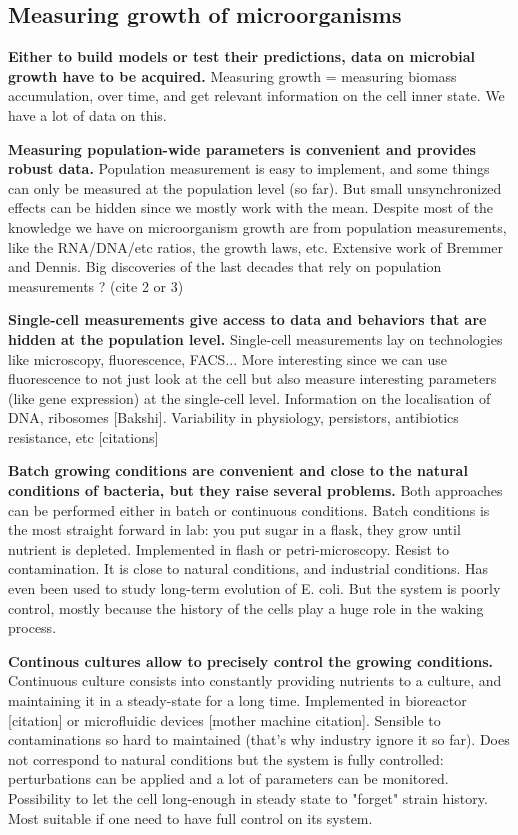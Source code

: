 \subsection{Measuring growth of microorganisms}

\textbf{Either to build models or test their predictions, data on microbial growth have to be acquired.}
Measuring growth = measuring biomass accumulation, over time, and get relevant information on the cell inner state.
We have a lot of data on this.

\textbf{Measuring population-wide parameters is convenient and provides robust data.}
Population measurement is easy to implement, and some things can only be measured at the population level (so far).
But small unsynchronized effects can be hidden since we mostly work with the mean.
Despite most of the knowledge we have on microorganism growth are from population measurements, like the RNA/DNA/etc ratios, the growth laws, etc.
Extensive work of Bremmer and Dennis.
Big discoveries of the last decades that rely on population measurements ? (cite 2 or 3)

\textbf{Single-cell measurements give access to data and behaviors that are hidden at the population level.}
Single-cell measurements lay on technologies like microscopy, fluorescence, FACS...
More interesting since we can use fluorescence to not just look at the cell but also measure interesting parameters (like gene expression) at the single-cell level.
Information on the localisation of DNA, ribosomes [Bakshi].
Variability in physiology, persistors, antibiotics resistance, etc [citations]

\textbf{Batch growing conditions are convenient and close to the natural conditions of bacteria, but they raise several problems.}
Both approaches can be performed either in batch or continuous conditions.
Batch conditions is the most straight forward in lab: you put sugar in a flask, they grow until nutrient is depleted.
Implemented in flash or petri-microscopy.
Resist to contamination.
It is close to natural conditions, and industrial conditions.
Has even been used to study long-term evolution of E. coli.
But the system is poorly control, mostly because the history of the cells play a huge role in the waking process.

\textbf{Continous cultures allow to precisely control the growing conditions.}
Continuous culture consists into constantly providing nutrients to a culture, and maintaining it in a steady-state for a long time.
Implemented in bioreactor [citation] or microfluidic devices [mother machine citation].
Sensible to contaminations so hard to maintained (that's why industry ignore it so far).
Does not correspond to natural conditions but the system is fully controlled: perturbations can be applied and a lot of parameters can be monitored.
Possibility to let the cell long-enough in steady state to "forget" strain history.
Most suitable if one need to have full control on its system.


